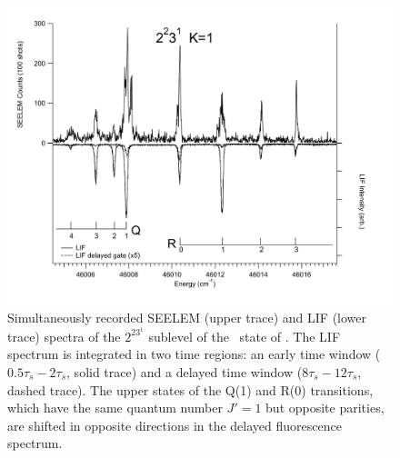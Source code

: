 \begin{figure}
  \caption{Simultaneously recorded SEELEM (upper trace) and LIF (lower
    trace) spectra of the $2^23^1$  sublevel of the \astate\
    state of .  The LIF spectrum is integrated in two time
    regions: an early time window ($0.5\tau_s-2\tau_s$, solid trace)
    and a delayed time window ($8\tau_s-12\tau_s$, dashed trace).  The
    upper states of the Q(1) and R(0) transitions, which have the same
    quantum number $J'=1$ but opposite parities, are shifted in
    opposite directions in the delayed fluorescence spectrum.}
  \label{fig:spectrum-2231}
  \centering
  \vspace{1cm}
  \includegraphics[width=7in,angle=90]{spectrum-2231-q4r3.pdf}
\end{figure}

